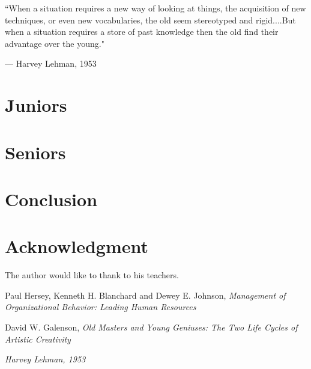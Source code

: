 \documentclass[conference]{IEEEtran}
\begin{document}
\epigraph{``When a situation requires a new way of looking at things, the acquisition of new techniques, or even new vocabularies, the old seem stereotyped and rigid....But when a situation requires a store of past knowledge then the old find their advantage over the young."}{--- \textup{Harvey Lehman}, 1953
}

\newpage
\section{Juniors}
\section{Seniors}

\newpage
\section{Conclusion}

\section*{Acknowledgment}
The author would like to thank to his teachers.

\newpage
\begin{thebibliography}{99}


Paul Hersey, Kenneth H. Blanchard and Dewey E. Johnson, \emph{Management of Organizational Behavior: Leading Human Resources}

David W. Galenson, \emph{Old Masters and Young Geniuses: The Two Life Cycles of Artistic Creativity}

\emph{Harvey Lehman, 1953} 

\end{thebibliography}
\end{document}
